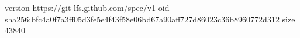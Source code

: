 version https://git-lfs.github.com/spec/v1
oid sha256:bfc4a0f7a3ff05d3fe5e4f43f58e06bd67a90aff727d86023c36b8960772d312
size 43840
